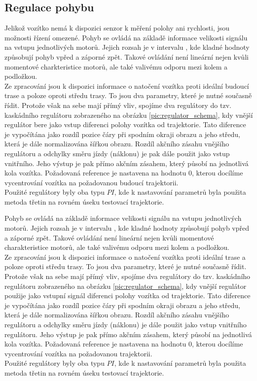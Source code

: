 \documentclass[czech, bc, kky, he, iso690alph]{fasthesis}
\begin{document}
            \subsection{Regulace pohybu}
                Jelikož vozítko nemá k dispozici senzor k měření polohy ani rychlosti, jsou možnosti řízení omezené. Pohyb se ovládá na základě informace velikosti signálu na vstupu jednotlivých motorů. Jejich rozsah je v intervalu \(<-1,1>\), kde kladné hodnoty způsobují pohyb vpřed a záporné zpět. Takové ovládání není lineární nejen kvůli momentové charkteristice motorů, ale také valivému odporu mezi kolem a podložkou.\\
                Ze zpracování jsou k dispozici informace o natočení vozítka proti ideální budoucí trase a poloze oproti středu trasy. To jsou dva parametry, které je nutné současně řídit. Protože však na sebe mají přímý vliv, spojíme dva regulátory do tzv. kaskádního regulátoru zobrazeného na obrázku \ref{pic:regulator_schema}, kdy vnější regulátor bere jako vstup diferenci polohy vozítka od trajektorie. Tato diference je vypočítána jako rozdíl pozice čáry při spodním okraji obrazu a jeho středu, která je dále normalizována šířkou obrazu.  Rozdíl akčního zásahu vnějšího regulátoru a odchylky směru jízdy (náklonu) je pak dále použit jako vstup vnitřního. Jeho výstup je pak přímo akčním zásahem, který působí na jednotlivá kola vozítka. Požadovaná reference je nastavena na hodnotu \(0\), kterou docílíme vycentrování vozítka na požadovanou budoucí trajektorii.\\
                Použité regulátory byly oba typu \(PI\), kde k nastavování parametrů byla použita metoda třetin na rovném úseku testovací trajektorie.
                
                Pohyb se ovládá na základě informace velikosti signálu na vstupu jednotlivých motorů. Jejich rozsah je v intervalu \(<-1,1>\), kde kladné hodnoty způsobují pohyb vpřed a záporné zpět. Takové ovládání není lineární nejen kvůli momentové charakteristice motorů, ale také valivému odporu mezi kolem a podložkou.\\
                Ze zpracování jsou k dispozici informace o natočení vozítka proti ideální trase a poloze oproti středu trasy. To jsou dva parametry, které je nutné současně řídit. Protože však na sebe mají přímý vliv, spojíme dva regulátory do tzv. kaskádního regulátoru zobrazeného na obrázku \ref{pic:regulator_schema}, kdy vnější regulátor použije jako vstupní signál diferenci polohy vozítka od trajektorie. Tato diference je vypočítána jako rozdíl pozice čáry při spodním okraji obrazu a jeho středu, která je dále normalizována šířkou obrazu.  Rozdíl akčního zásahu vnějšího regulátoru a odchylky směru jízdy (náklonu) je dále použit jako vstup vnitřního regulátoru. Jeho výstup je pak přímo akčním zásahem, který působí na jednotlivá kola vozítka. Požadovaná reference je nastavena na hodnotu \(0\), kterou docílíme vycentrování vozítka na požadovanou trajektorii.\\
                Použité regulátory byly oba typu \(PI\), kde k nastavování parametrů byla použita metoda třetin na rovném úseku testovací trajektorie.
                 
\end{document}
